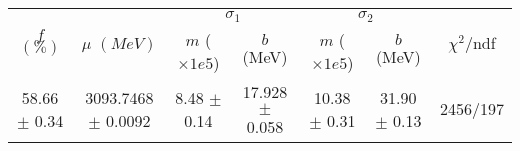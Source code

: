 \begin{tabular}{c|c|cc|cc||c}
 \multirow{2}{*}{$f$ $(\%)$} & \multirow{2}{*}{$\mu$ $(MeV)$} & \multicolumn{2}{|c|}{$\sigma_1$} & \multicolumn{2}{|c||}{$\sigma_2$} & \multirow{2}{*}{$\chi^2/$ndf} \\
 & & $m$ ($\times1e5$) & $b$ (MeV) & $m$ ($\times1e5$) & $b$ (MeV) & \\
\hline
58.66 $\pm$ 0.34 & 3093.7468 $\pm$ 0.0092 & 8.48 $\pm$ 0.14 & 17.928 $\pm$ 0.058 & 10.38 $\pm$ 0.31 & 31.90 $\pm$ 0.13 & 2456/197\\
\end{tabular}
